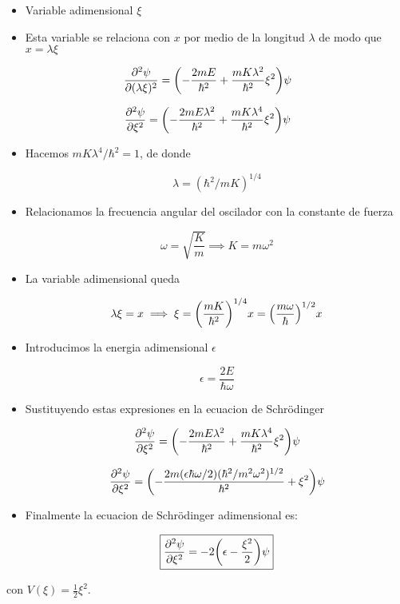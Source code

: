 \documentclass[11pt]{article}
\begin{document}
\begin{itemize}
\item Variable adimensional \(\xi\)
\item Esta variable se relaciona con \(x\) por medio de la longitud \(\lambda\) de modo que \(x = \lambda \xi\)
\end{itemize}

\[ \pdv[2]{\psi}{(\lambda \xi)} = \qty( - \frac{2m E }{\hbar^2} + \frac{mK \lambda^2}{\hbar^2} \xi^2  )\psi \]

\[ \pdv[2]{\psi}{\xi} = \qty( - \frac{2m E \lambda^{2}}{\hbar^2} + \frac{mK \lambda^4}{\hbar^2} \xi^2  )\psi \]

\begin{itemize}
\item Hacemos \(mK\lambda^4 /\hbar^2 = 1\), de donde

\[ \lambda = (\hbar^2/mK)^{1/4} \]

\item Relacionamos la frecuencia angular del oscilador con la constante de fuerza

\[ \omega = \sqrt{\frac{K}{m}} \implies K = m\omega^2 \]

\item La variable adimensional queda

\[ \lambda\xi = x \implies \xi=\qty(\frac{mK}{\hbar^2})^{1/4} x = \qty(\frac{m \omega}{\hbar})^{1/2} x  \]

\item Introducimos la energia adimensional \(\epsilon\)

\[ \epsilon = \frac{2E}{\hbar \omega} \]

\item Sustituyendo estas expresiones en la ecuacion de Schrödinger

\[ \pdv[2]{\psi}{\xi} = \qty( - \frac{2m E \lambda^{2}}{\hbar^2} + \frac{mK \lambda^4}{\hbar^2} \xi^2  )\psi \]

\[ \pdv[2]{\psi}{\xi} = \qty( - \frac{2m (\epsilon \hbar \omega/2) (\hbar^2/m^2\omega^2)^{1/2}}{\hbar^2} +  \xi^2  )\psi \]

\item Finalmente la ecuacion de Schrödinger adimensional es:

\begin{equation}
\label{eq:ho}
\boxed{\pdv[2]{\psi}{\xi} = -2\qty(\epsilon - \frac{\xi^2}{2})\psi}
\end{equation}
\end{itemize}

con \(V(\xi) = \frac{1}{2}\xi^2\).
\end{document}
